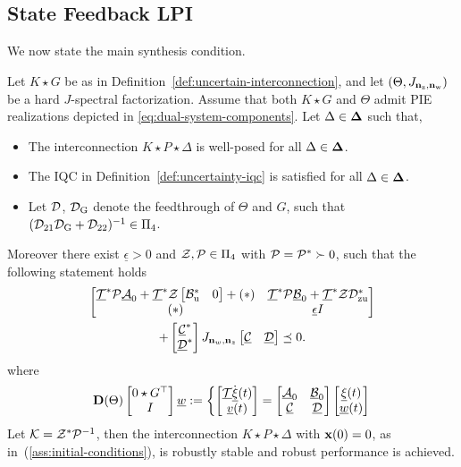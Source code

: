 \subsection{State Feedback LPI}
We now state the main synthesis condition.
\begin{corollary}\label{thm:state-feedback}
    Let $K\star G$ be as in Definition~\ref{def:uncertain-interconnection}, and let
$(\Theta,J_{\mathbf{n}_{{\mathrm{z}}},\mathbf{n}_{{\mathrm{w}}}})$ be a hard
$J$-spectral factorization. Assume that both $K\star G$ and $\Theta$ admit
PIE realizations depicted in \eqref{eq:dual-system-components}. Let $\Delta \in \mathbf{\Delta}$ such that, 
    \begin{itemize}
        \item The interconnection $K\star P\star\Delta$ is well-posed for all
        $\Delta\in\mathbf{\Delta}$.
        \item The IQC in Definition~\ref{def:uncertainty-iqc} is satisfied for all $\Delta\in\mathbf{\Delta}$.
        \item Let $\mathcal{D}$, $\mathcal{D}_{\mathrm{G}}$ denote the feedthrough of $\Theta$ and $G$, such that $(\mathcal{D}_{21}\mathcal{D}_{\mathrm{G}} + \mathcal{D}_{22})^{-1}\in\Pi_4$.
    
    \end{itemize}
     Moreover there exist $\underline\epsilon>0$ and $\mathcal{Z},\mathcal{P}\in\Pi_4$ with $\mathcal{P} = \mathcal{P}^* \succ 0$, such that the following statement holds
    \begin{equation}\label{eq:controller-kyp}
        \begin{gathered}
            \begin{bmatrix}
                \underline{\mathcal{T}}^*\mathcal{P}\underline{\mathcal{A}}_0
                +
                \underline{\mathcal{T}}^*\mathcal{Z}\begin{bmatrix}\mathcal{B}_{{\mathrm{u}}}^*&0\end{bmatrix}
                +(*)
                &
                \underline{\mathcal{T}}^*\mathcal{P}\underline{\mathcal{B}}_0
                +
                \underline{\mathcal{T}}^*\mathcal{Z}\mathcal{D}_{{\mathrm{zu}}}^*
                \\
                (*)&
                \underline\epsilon I
            \end{bmatrix}\\
                +\begin{bmatrix}\underline{\mathcal{C}}^*\\\underline{\mathcal{D}}^*\end{bmatrix}
                J_{\mathbf{n}_w, \mathbf{n}_z}
                \begin{bmatrix}\underline{\mathcal{C}}&\underline{\mathcal{D}}\end{bmatrix}
                \preceq0.
        \end{gathered}
\end{equation}
where
\begin{equation}\label{eq:feedback-system}
\mathbf{D}(\Theta)\begin{bmatrix}0\star G^\top\\I\end{bmatrix}\underline{w}
:=
\left\{
\begin{bmatrix}
\underline{\mathcal{T}}\dot{\underline{\mathbf{\xi}}}(t)\\
{\underline{v}}(t)
\end{bmatrix}
=
\begin{bmatrix}
\underline{\mathcal{A}}_0 & \underline{\mathcal{B}}_0\\
\underline{\mathcal{C}} & \underline{\mathcal{D}}
\end{bmatrix}
\begin{bmatrix}
\underline{\mathbf{\xi}}(t)\\
\underline{w}(t)
\end{bmatrix}
\right.
\end{equation}
Let $\mathcal{K}=\mathcal{Z}^*\mathcal{P}^{-1}$, then
the interconnection $K\star P\star\Delta$ with $\mathbf{x}(0)=0$, as
in~(\ref{ass:initial-conditions}), is robustly stable and robust
performance is achieved.
\end{corollary}
